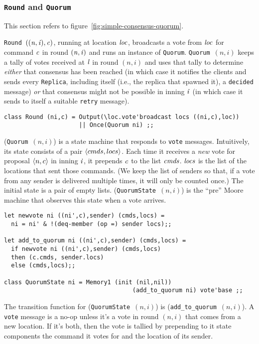 \documentclass[final]{article}
\begin{document}
\subsubsection{\lstinline{Round} and \lstinline{Quorum}}

This section refers to figure~\ref{fig:simple-consensus-quorum}.


\lstinline{Round}~$\mathit{((n,i),c)}$, running at location
$\mathit{loc}$, broadcasts a vote from $\mathit{loc}$ for command
$\mathit{c}$ in round $\mathit{(n,i)}$ and runs an instance of
\lstinline{Quorum}.  \lstinline{Quorum}~$(n,i)$ keeps a tally of votes
received at $\mathit{l}$ in round $(n,i)$ and uses that tally to
determine \emph{either} that consensus has been reached (in which case
it notifies the clients and sends every \lstinline{Replica}, including
itself (i.e., the replica that spawned it), a \lstinline{decided}
message) \emph{or} that consensus might not be possible in inning
$\mathit{i}$ (in which case it sends to itself a suitable
\lstinline{retry} message).
\begin{emlcode}
\begin{lstlisting}
class Round (ni,c) = Output(\loc.vote'broadcast locs ((ni,c),loc))
                     || Once(Quorum ni) ;;
\end{lstlisting}
\end{emlcode}

\vspace{1.0ex} (\lstinline{Quorum}~$(n,i)$) is a state machine that
responds to \lstinline{vote} messages.  Intuitively, its state
consists of a pair $\langle cmds,locs\rangle$.  Each time it receives a
\emph{new} vote for proposal $\langle n,c\rangle$ in inning $\mathit{i}$,
it prepends $\mathit{c}$ to the list $\mathit{cmds}$.  $\mathit{locs}$ is
the list of the locations that sent those commands.  (We keep the list
of senders so that, if a vote from any sender is delivered multiple
times, it will only be counted once.)  The initial state is a pair of
empty lists.  (\lstinline{QuorumState}~$(n,i)$) is the ``pre'' Moore
machine that observes this state when a vote arrives.

\begin{emlcode}
\begin{lstlisting}
let newvote ni ((ni',c),sender) (cmds,locs) =
  ni = ni' & !(deq-member (op =) sender locs);;

let add_to_quorum ni ((ni',c),sender) (cmds,locs) =
  if newvote ni ((ni',c),sender) (cmds,locs)
  then (c.cmds, sender.locs)
  else (cmds,locs);;

class QuorumState ni = Memory1 (init (nil,nil))
                                    (add_to_quorum ni) vote'base ;;
\end{lstlisting}
\end{emlcode}
The transition function for (\lstinline{QuorumState}~$(n,i)$) is
(\lstinline{add_to_quorum}~$(n,i)$).  A \lstinline{vote} message is a
no-op unless it's a vote in round $(n,i)$ that comes from a new
location.  If it's both, then the vote is tallied by prepending to it
state components the command it votes for and the location of its
sender.
\end{document}
